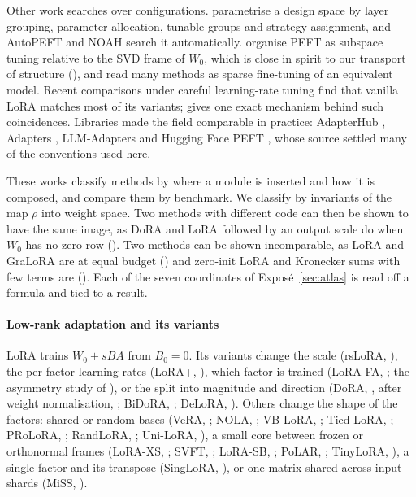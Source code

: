 Other work searches over configurations. \citet{chen2023parameter} parametrise a design space by layer grouping, parameter allocation, tunable groups and strategy assignment, and AutoPEFT \citep{zhou2023autopeft} and NOAH \citep{zhang2022neural} search it automatically. \citet{si2024see} organise PEFT as subspace tuning relative to the SVD frame of $W_0$, which is close in spirit to our transport of structure (), and \citet{fu2022effectiveness} read many methods as sparse fine-tuning of an equivalent model. Recent comparisons under careful learning-rate tuning \citep{he2026unified,lee2026learning} find that vanilla LoRA matches most of its variants;  gives one exact mechanism behind such coincidences. Libraries made the field comparable in practice: AdapterHub \citep{pfeiffer2020adapterhub}, Adapters \citep{poth2023adapters}, LLM-Adapters \citep{hu2023llm} and Hugging Face PEFT \citep{xmangrulkar2022peft}, whose source settled many of the conventions used here.

These works classify methods by where a module is inserted and how it is composed, and compare them by benchmark. We classify by invariants of the map $\rho$ into weight space. Two methods with different code can then be shown to have the same image, as DoRA and LoRA followed by an output scale do when $W_0$ has no zero row (). Two methods can be shown incomparable, as LoRA and GraLoRA are at equal budget () and zero-init LoRA and Kronecker sums with few terms are (). Each of the seven coordinates of Exposé~\ref{sec:atlas} is read off a formula and tied to a result.

\paragraph{Low-rank adaptation and its variants}
LoRA \citep{hu2021lora} trains $W_0+sBA$ from $B_0=0$. Its variants change the scale (rsLoRA, \citealp{kalajdzievski2023rank}), the per-factor learning rates (LoRA+, \citealp{hayou2024lora}), which factor is trained (LoRA-FA, \citealp{zhang2023lora}; the asymmetry study of \citealp{zhu2024asymmetry}), or the split into magnitude and direction (DoRA, \citealp{liu2024dora}, after weight normalisation, \citealp{salimans2016weight}; BiDoRA, \citealp{qin2024bidora}; DeLoRA, \citealp{bini2025delora}). Others change the shape of the factors: shared or random bases (VeRA, \citealp{kopiczko2023vera}; NOLA, \citealp{koohpayegani2023nola}; VB-LoRA, \citealp{li2024vb}; Tied-LoRA, \citealp{renduchintala2023tied}; PRoLoRA, \citealp{wang2024prolora}; RandLoRA, \citealp{albert2025randlora}; Uni-LoRA, \citealp{li2025uni}), a small core between frozen or orthonormal frames (LoRA-XS, \citealp{baazy2024lora}; SVFT, \citealp{lingam2024svft}; LoRA-SB, \citealp{ponkshe2024initialization}; PoLAR, \citealp{lion2025polar}; TinyLoRA, \citealp{morris2026learning}), a single factor and its transpose (SingLoRA, \citealp{bensaid2025singlora}), or one matrix shared across input shards (MiSS, \citealp{kang2024miss}).

